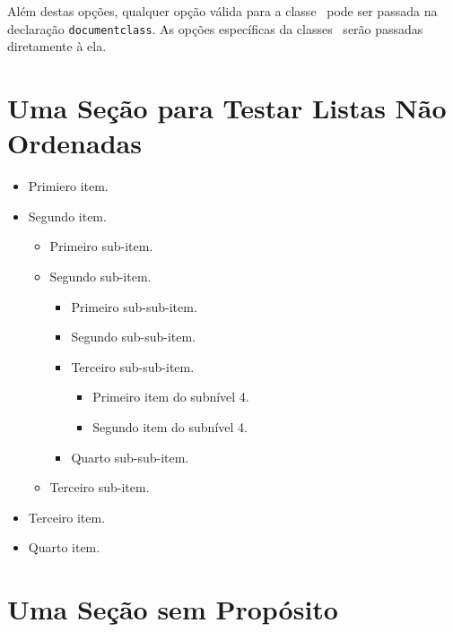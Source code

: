\documentclass[times,english,brazilian,oneside,section=TITLE]{ifes8}
\begin{document}
Além destas opções, qualquer opção válida para a classe \abnTeX\ pode
ser passada na declaração \texttt{documentclass}. As opções
específicas da classes \abnTeX\ serão passadas diretamente à ela.


\section{Uma Seção para Testar Listas Não Ordenadas}

\blindtext[1]

\begin{itemize}
\item Primiero item.
\item Segundo item.
  \begin{itemize}
  \item Primeiro sub-item.
  \item Segundo sub-item.
    \begin{itemize}
    \item Primeiro sub-sub-item.
    \item Segundo sub-sub-item.
    \item Terceiro sub-sub-item.
      \begin{itemize}
      \item Primeiro item do subnível 4.
      \item Segundo item do subnível 4.
      \end{itemize}
    \item Quarto sub-sub-item.
    \end{itemize}
  \item Terceiro sub-item.
  \end{itemize}
\item Terceiro item.
\item Quarto item.
\end{itemize}

\blindtext[2]


\section{Uma Seção sem Propósito}
\label{sec:sem-proposito1}

\Blindtext

\blinditemize[7]

\blindtext[2]

\blindenumerate[5]

\blindtext



\end{document}
